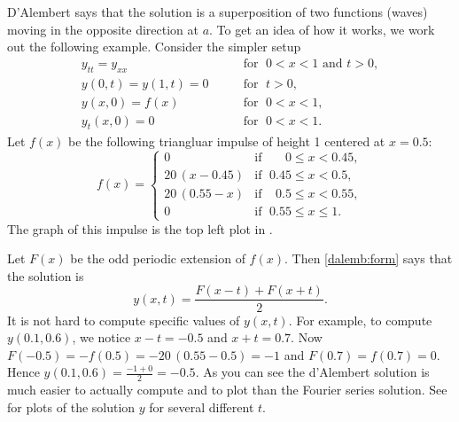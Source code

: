 \begin{example} \label{dalemb:implusexample}
D'Alembert says that the solution is a superposition of
two functions (waves) moving in the opposite direction at  $a$.
To get an idea of
how it works, we work out the following example.
Consider the simpler setup
\begin{equation*}
\begin{array}{ll}
y_{tt} = y_{xx} & \qquad \text{for } \; 0 < x < 1 \text{ and } t > 0, \\
y(0,t) = y(1,t) = 0 & \qquad \text{for } \; t > 0, \\
y(x,0) = f(x)  & \qquad \text{for } \; 0 < x < 1, \\
y_t(x,0) = 0   & \qquad \text{for } \; 0 < x < 1 .
\end{array}
\end{equation*}
Let $f(x)$ be the following triangluar impulse of height 1 centered at $x=0.5$:
\begin{equation*}
f(x) =
\begin{cases}
0 & \text{if } \; \phantom{0.5}0 \leq x < 0.45, \\
20\,(x-0.45) & \text{if } \; 0.45 \leq x < 0.5, \\
20\,(0.55-x) & \text{if } \; \phantom{5}0.5 \leq x < 0.55, \\
0 & \text{if } \; 0.55 \leq x \leq 1 .
\end{cases}
\end{equation*}
The graph of this impulse is the top left plot in
.

Let $F(x)$ be the odd periodic extension of $f(x)$.  Then
\eqref{dalemb:form} says that
the solution is
\begin{equation*}
y(x,t) = \frac{F(x-t) + F(x+t)}{2} .
\end{equation*}
It is not hard to compute specific values of $y(x,t)$.
For example, to
compute $y(0.1,0.6)$, we notice $x-t = -0.5$ and $x+t = 0.7$.
Now $F(-0.5) =
-f(0.5) = - 20\,(0.55 - 0.5) = -1$
and $F(0.7) = f(0.7) = 0$.  Hence
$y(0.1,0.6) = \frac{-1 + 0}{2} = -0.5$.  As you can see the d'Alembert
solution is much easier to actually compute and to plot than the Fourier series
solution.  See  for plots of the solution $y$
for several different $t$.
\begin{myfig}
\capstart
\\[5pt]
\caption{Plot of the d'Alembert solution for $t=0$, $t=0.2$, $t=0.4$, and
$t=0.6$.%
\label{dalemb:impulsfig}}
\end{myfig}
\end{example}

